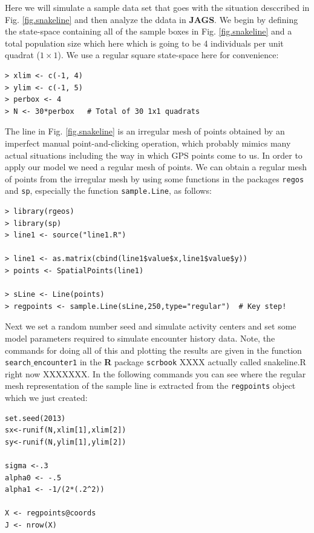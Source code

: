 Here we will simulate a sample data set that goes with the situation
desccribed in Fig. \ref{fig.snakeline} and then analyze the ddata in
{\bf JAGS}.  We begin by defining the state-space containing all of
the sample boxes in Fig. \ref{fig.snakeline} and a total population
size which here which is going to be 4 individuals per unit quadrat
($1 \times 1$). We use a regular square state-space here for
convenience:
\begin{verbatim}
> xlim <- c(-1, 4)
> ylim <- c(-1, 5)
> perbox <- 4
> N <- 30*perbox   # Total of 30 1x1 quadrats
\end{verbatim}
The line in Fig. \ref{fig.snakeline}  is an irregular mesh of points
obtained by an imperfect manual point-and-clicking operation, which
probably mimics many actual situations including the way in which GPS
points come to us. In order to apply our model we need a regular mesh
of points. We can obtain a regular mesh of points from the irregular
mesh by using 
some functions in the packages \mbox{\tt regos}
and \mbox{\tt sp}, especially the function \mbox{\tt sample.Line}, as follows:
\begin{verbatim}
> library(rgeos)
> library(sp)
> line1 <- source("line1.R")

> line1 <- as.matrix(cbind(line1$value$x,line1$value$y))
> points <- SpatialPoints(line1)

> sLine <- Line(points)
> regpoints <- sample.Line(sLine,250,type="regular")  # Key step! 
\end{verbatim}
Next we set a random number seed and simulate activity centers and set
some model parameters required to simulate encounter history data. 
Note, the commands for doing all of this and plotting the results are given
in the function \mbox{\tt search$\_$encounter1} in the {\bf R} package
\mbox{\tt scrbook} XXXX actually called snakeline.R right now
XXXXXXX. 
In the following commands you can see where the
regular mesh representation of the sample line is extracted from the
\mbox{\tt regpoints} object which we just created:
\begin{verbatim}
set.seed(2013)
sx<-runif(N,xlim[1],xlim[2])
sy<-runif(N,ylim[1],ylim[2])

sigma <-.3
alpha0 <- -.5
alpha1 <- -1/(2*(.2^2))

X <- regpoints@coords
J <- nrow(X)
\end{verbatim}

